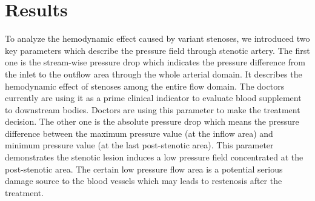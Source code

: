 \section{Results}

To analyze the hemodynamic effect caused by variant stenoses, we introduced two key parameters which describe the pressure field through stenotic artery. 
The first one is the  stream-wise pressure drop which indicates the pressure difference from the inlet to the outflow area through the whole arterial domain.  
It describes the hemodynamic effect of stenoses among the entire flow domain. The doctors currently are using it as a prime clinical indicator to evaluate blood supplement to downstream bodies. Doctors are using this parameter to make the treatment decision.
The other one is the absolute pressure drop which means the pressure difference between the maximum pressure value (at the inflow area) and minimum pressure value (at the last post-stenotic area). 
This parameter demonstrates the stenotic lesion induces a low pressure field concentrated at the post-stenotic area. 
The certain low pressure flow area is a potential serious damage source to the blood vessels which may leads to restenosis after the treatment. 


